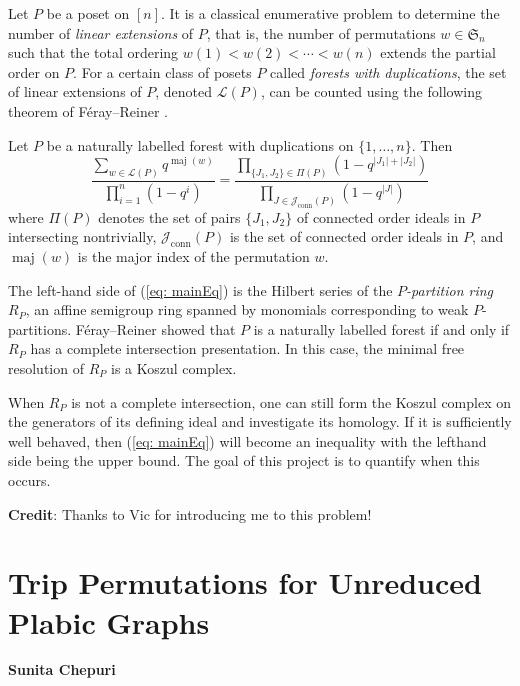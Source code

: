\documentclass{paper}
\newcommand{\maj}{\operatorname{maj}}
\newcommand{\conn}{\mathcal{J}_{\text{conn}}}
\begin{document}
Let $P$ be a poset on $[n]$. It is a classical enumerative problem to determine the number of \textit{linear extensions} of $P$, that is, the number of permutations $w\in\mathfrak{S}_n$ such that the total ordering $w(1)<w(2)< \cdots <w(n)$ extends the partial order on $P$. For a certain class of posets $P$ called \textit{forests with duplications}, the set of linear extensions of $P$, denoted $\mathcal{L}(P)$, can be counted using the following theorem of F\'eray--Reiner \cite[Theorem 1.1]{FerayReiner}.

\begin{theorem}\label{thm:FR}
Let $P$ be a naturally labelled forest with duplications on $\{1,\ldots,n\}$. Then
\begin{equation}\label{eq: mainEq}
\frac{\sum_{w\in\mathcal{L}(P)} q^{\maj(w)}}{ \prod_{i=1}^n\left(1-q^i\right)} = \frac{ \prod_{\{J_1,J_2\}\in\Pi(P)}\left(1-q^{|J_1|+|J_2|}\right)}{\prod_{J\in\conn(P)}\left(1-q^{|J|}\right)}
\end{equation}
where $\Pi(P)$ denotes the set of pairs $\{J_1,J_2\}$ of connected order ideals in $P$ intersecting nontrivially, $\conn(P)$ is the set of connected order ideals in $P$, and $\maj(w)$ is the major index of the permutation $w$.
\end{theorem}

The left-hand side of (\ref{eq: mainEq}) is the Hilbert series of the \textit{$P$-partition ring} $R_P$, an affine semigroup ring spanned by monomials corresponding to weak $P$-partitions. F\'eray--Reiner showed that $P$ is a naturally labelled forest if and only if $R_P$ has a complete intersection presentation. In this case, the minimal free resolution of $R_P$ is a Koszul complex. 

When $R_P$ is not a complete intersection, one can still form the Koszul complex on the generators of its defining ideal and investigate its homology. If it is sufficiently well behaved, then (\ref{eq: mainEq}) will become an inequality with the lefthand side being the upper bound. The goal of this project is to quantify when this occurs.


\textbf{Credit}: Thanks to Vic for introducing me to this problem!



\section{Trip Permutations for Unreduced Plabic Graphs}

\hfill{\textbf{Sunita Chepuri}}
\end{document}

